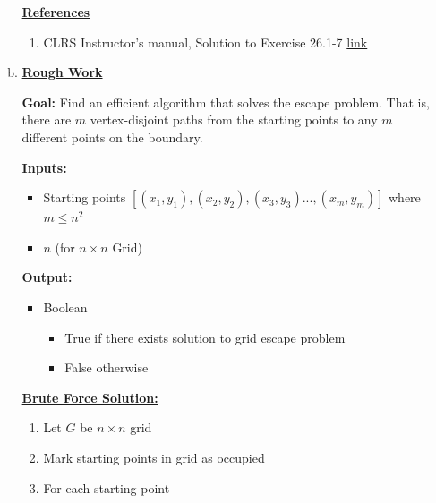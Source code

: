 \documentclass[12pt]{article}
\begin{document}
\begin{enumerate}[1.]
\begin{enumerate}[a)]
        \bigskip

        \underline{\textbf{References}}

        \bigskip

        \begin{enumerate}[1)]
            \item CLRS Instructor's manual, Solution to Exercise 26.1-7 \href{https://cdn.manesht.ir/19908___Introduction%20to%20Algorithms.pdf}{link}
        \end{enumerate}

        \item

        \underline{\textbf{Rough Work}}

        \bigskip

        \textbf{Goal:} Find an efficient algorithm that solves the escape problem. That is,
        there are $m$ vertex-disjoint paths from the starting points to any $m$ different
        points on the boundary.

        \bigskip

        \textbf{Inputs:}

        \begin{itemize}
            \item Starting points $[(x_1, y_1), (x_2, y_2), (x_3, y_3) ..., (x_m,y_m)]$ where $m \leq n^2$
            \item $n$ (for $n \times n$ Grid)
        \end{itemize}

        \bigskip

        \textbf{Output:}

        \begin{itemize}
            \item Boolean
            \begin{itemize}
                \item True if there exists solution to grid escape problem
                \item False otherwise
            \end{itemize}
        \end{itemize}

        \bigskip

        \underline{\textbf{Brute Force Solution:}}

        \bigskip

        \begin{enumerate}[1)]
            \item Let $G$ be $n \times n$ grid
            \item Mark starting points in grid as occupied
            \item For each starting point


\end{enumerate}
\end{enumerate}
\end{enumerate}
\end{document}
